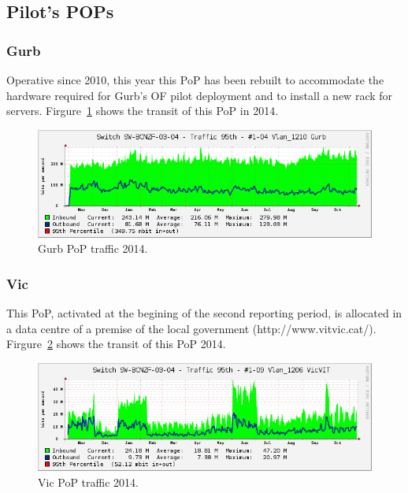 \FloatBarrier
\subsection{Pilot's POPs}
\label{pop_pilots}


\FloatBarrier
\subsubsection{Gurb}
\label{pop_gurb}

Operative since 2010, this year this PoP has been rebuilt to accommodate the hardware required for Gurb's OF pilot deployment and to install a new rack for servers. Firgure~\ref{fig:gurb_transit} shows the transit of this PoP in 2014.

\begin{figure}[H]
  \centering
  \includegraphics[width=0.95\linewidth]{sect3/figures/gurb.png} 
  \caption[Gurb PoP traffic 2014]{Gurb PoP traffic 2014.}
  \label{fig:gurb_transit}
\end{figure}


\FloatBarrier
\subsubsection{Vic}
\label{pop_vic}

This PoP, activated at the begining of the second reporting period, is allocated in a data centre of a premise of the local government (http://www.vitvic.cat/). Firgure~\ref{fig:vic_transit} shows the transit of this PoP 2014.

\begin{figure}[H]
  \centering
  \includegraphics[width=0.95\linewidth]{sect3/figures/vic.png} 
  \caption[Vic PoP traffic 2014]{Vic PoP traffic 2014.}
  \label{fig:vic_transit}
\end{figure}



